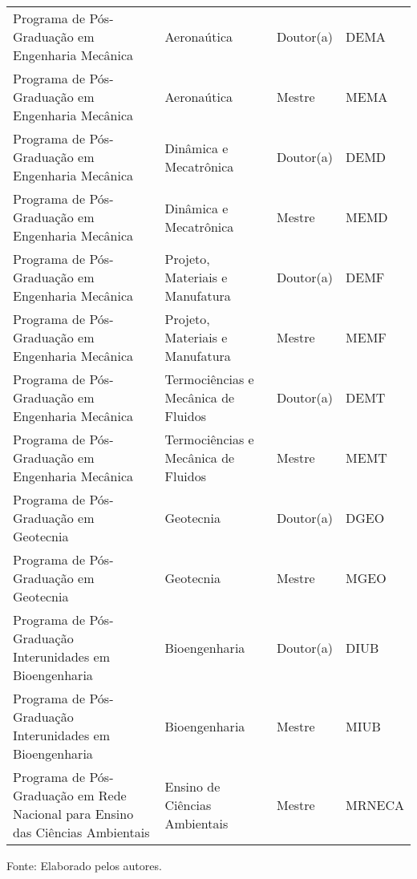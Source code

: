 \begin{apendicesenv}
\begin{quadro}[htb]
\begin{tabular}{|p{6.0cm}|p{4.5cm}|p{2.0cm}|p{1.75cm}|}
Programa de Pós-Graduação em Engenharia Mecânica & Aerona\'utica & Doutor(a) & DEMA \\
Programa de Pós-Graduação em Engenharia Mecânica & Aerona\'utica & Mestre & MEMA \\
Programa de Pós-Graduação em Engenharia Mecânica & Din\^amica e Mecatr\^onica & Doutor(a) & DEMD \\
Programa de Pós-Graduação em Engenharia Mecânica & Din\^amica e Mecatr\^onica & Mestre & MEMD \\
Programa de Pós-Graduação em Engenharia Mecânica & Projeto, Materiais e Manufatura  & Doutor(a) & DEMF \\
Programa de Pós-Graduação em Engenharia Mecânica & Projeto, Materiais e Manufatura  & Mestre & MEMF \\
Programa de Pós-Graduação em Engenharia Mecânica & Termoci\^encias e Mec\^anica de Fluidos & Doutor(a) & DEMT \\
Programa de Pós-Graduação em Engenharia Mecânica & Termoci\^encias e Mec\^anica de Fluidos & Mestre & MEMT \\
Programa de Pós-Graduação em Geotecnia & Geotecnia & Doutor(a) & DGEO \\
Programa de Pós-Graduação em Geotecnia & Geotecnia & Mestre & MGEO \\
Programa de Pós-Graduação Interunidades em Bioengenharia & Bioengenharia & Doutor(a) & DIUB \\
Programa de Pós-Graduação Interunidades em Bioengenharia & Bioengenharia & Mestre & MIUB \\
Programa de Pós-Graduação em Rede Nacional para Ensino das Ciências Ambientais & Ensino de Ciências Ambientais & Mestre & MRNECA \\        
    \hline
\end{tabular}
\begin{flushleft}
Fonte: Elaborado pelos autores.\
\end{flushleft}
\end{quadro}



\end{apendicesenv}
